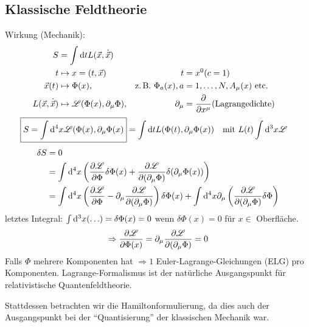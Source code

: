 \subsection{Klassische Feldtheorie}
	Wirkung (Mechanik):
		\begin{align*}
			S &= \int \mathrm{d} t L(\vec{x}, \dot{\vec{x}}) \\
			t &\mapsto x = (t, \vec{x}) & t&= x^0 (c=1)\\
			\vec{x}(t) &\mapsto \Phi (x),&  \text{z.\,B. } \Phi_a(x), a &= 1,\ldots,N, A_\mu (x) \text{ etc.} \\
			L(\vec{x}, \dot{\vec{x}}) &\mapsto \mathscr{L} (\Phi(x), \partial_\mu \Phi),& \partial_\mu &= \frac{\partial}{\partial x^{\mu}} (\text{Lagrangedichte})		
		\end{align*}
		\begin{align*}
			\boxed{S= \int \mathrm{d}^4 x \mathscr{L} (\Phi (x), \partial_\mu \Phi(x)}
			&= \int \mathrm{d} t L (\Phi (t), \partial_\mu \Phi(x)) & &\text{mit }L(t) \int \mathrm{d}^3 x \mathscr{L}
		\end{align*}
		\begin{align*}
			\delta S &= 0 \\
			&= \int \mathrm{d}^4x \left(
				\frac{\partial \mathscr{L}}{\partial \Phi} \delta \Phi(x)
				+ \frac{\partial \mathscr{L}}{\partial (\partial_\mu \Phi)} \delta (\partial_\mu \Phi (x))
			\right)	 \\
			&= \int \mathrm{d}^4 x \left(
				\frac{\partial \mathscr{L}}{\partial \Phi} - \partial_\mu \frac{\partial \mathscr{L}}{\partial (\partial_\mu \Phi)}
			\right) \delta \Phi (x) +
			\int \mathrm{d}^4 x \partial_\mu \left(
				\frac{\partial \mathscr{L}}{\partial (\partial_\mu \Phi)} \delta \Phi
			\right)
		\end{align*}
	letztes Integral: $\int \mathrm{d}^3x (\ldots) = \delta \Phi (x) = 0$
	wenn $\delta \Phi(x) = 0$ für $x \in$ Oberfläche.
		\begin{align*}
			\Rightarrow \frac{\partial \mathscr{L}}{\partial \Phi(x)} = \partial_\mu \frac{\partial \mathscr{L}}{\partial(\partial_\mu \Phi)} = 0
		\end{align*}
	Falls $\Phi$ mehrere Komponenten hat $\Rightarrow 1$  Euler-Lagrange-Gleichungen (ELG) pro Komponenten.
	Lagrange-Formalismus ist der natürliche Ausgangspunkt für relativistische Quantenfeldtheorie.
	
	Stattdessen betrachten wir die Hamiltonformulierung, da dies auch der Ausgangspunkt bei der ``Quantisierung'' der klassischen Mechanik war.
	
